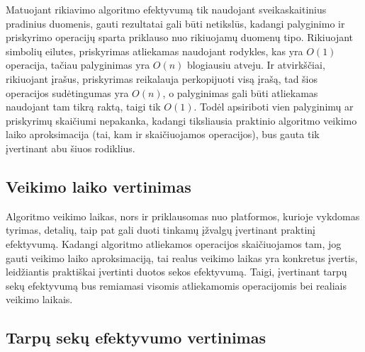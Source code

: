 \documentclass{VUMIFInfKursinis}
\begin{document}
Matuojant rikiavimo algoritmo efektyvumą tik naudojant sveikaskaitinius pradinius duomenis, gauti rezultatai gali būti netikslūs,
kadangi palyginimo ir priskyrimo operacijų sparta priklauso nuo rikiuojamų duomenų tipo.
Rikiuojant simbolių eilutes, priskyrimas atliekamas naudojant rodykles, kas yra $O(1)$ operacija,
tačiau palyginimas yra $O(n)$ blogiausiu atveju.
Ir atvirkščiai, rikiuojant įrašus, priskyrimas reikalauja perkopijuoti visą įrašą, tad šios operacijos sudėtingumas yra $O(n)$,
o palyginimas gali būti atliekamas naudojant tam tikrą raktą, taigi tik $O(1)$.
Todėl apsiriboti vien palyginimų ar priskyrimų skaičiumi nepakanka, kadangi tiksliausia praktinio algoritmo
veikimo laiko aproksimacija (tai, kam ir skaičiuojamos operacijos), bus gauta tik įvertinant abu šiuos rodiklius.

\subsection{Veikimo laiko vertinimas}

Algoritmo veikimo laikas, nors ir priklausomas nuo platformos, kurioje vykdomas tyrimas, detalių,
taip pat gali duoti tinkamų įžvalgų įvertinant praktinį efektyvumą.
Kadangi algoritmo atliekamos operacijos skaičiuojamos tam, jog gauti
veikimo laiko aproksimaciją, tai realus veikimo laikas
yra konkretus įvertis, leidžiantis praktiškai įvertinti duotos sekos efektyvumą.
Taigi, įvertinant tarpų sekų efektyvumą bus remiamasi visomis atliekamomis operacijomis bei realiais veikimo laikais.

\subsection{Tarpų sekų efektyvumo vertinimas}
\end{document}
